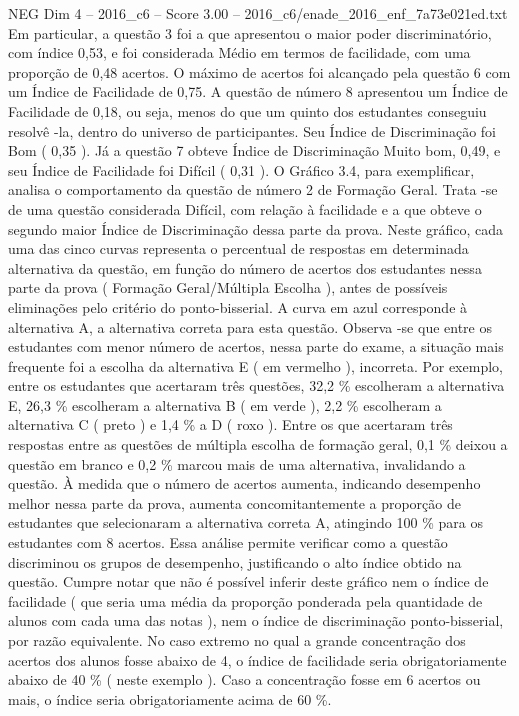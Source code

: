 \begin{textsample}{NEG Dim 4 – 2016\_c6 – Score 3.00 – 2016\_c6/enade\_2016\_enf\_7a73e021ed.txt}
Em particular, a questão 3 foi a que apresentou o maior poder discriminatório, com índice 0,53, e foi considerada Médio em termos de facilidade, com uma proporção de 0,48 acertos.
O máximo de acertos foi alcançado pela questão 6 com um Índice de Facilidade de 0,75.
A questão de número 8 apresentou um Índice de Facilidade de 0,18, ou seja, menos do que um quinto dos estudantes conseguiu resolvê -la, dentro do universo de participantes.
Seu Índice de Discriminação foi Bom ( 0,35 ).
Já a questão 7 obteve Índice de Discriminação Muito bom, 0,49, e seu Índice de Facilidade foi Difícil ( 0,31 ).
O Gráfico 3.4, para exemplificar, analisa o comportamento da questão de número 2 de Formação Geral.
Trata -se de uma questão considerada Difícil, com relação à facilidade e a que obteve o segundo maior Índice de Discriminação dessa parte da prova.
Neste gráfico, cada uma das cinco curvas representa o percentual de respostas em determinada alternativa da questão, em função do número de acertos dos estudantes nessa parte da prova ( Formação Geral/Múltipla Escolha ), antes de possíveis eliminações pelo critério do ponto-bisserial.
A curva em azul corresponde à alternativa A, a alternativa correta para esta questão.
Observa -se que entre os estudantes com menor número de acertos, nessa parte do exame, a situação mais frequente foi a escolha da alternativa E ( em vermelho ), incorreta.
Por exemplo, entre os estudantes que acertaram três questões, 32,2 \% escolheram a alternativa E, 26,3 \% escolheram a alternativa B ( em verde ), 2,2 \% escolheram a alternativa C ( preto ) e 1,4 \% a D ( roxo ).
Entre os que acertaram três respostas entre as questões de múltipla escolha de formação geral, 0,1 \% deixou a questão em branco e 0,2 \% marcou mais de uma alternativa, invalidando a questão.
À medida que o número de acertos aumenta, indicando desempenho melhor nessa parte da prova, aumenta concomitantemente a proporção de estudantes que selecionaram a alternativa correta A, atingindo 100 \% para os estudantes com 8 acertos.
Essa análise permite verificar como a questão discriminou os grupos de desempenho, justificando o alto índice obtido na questão.
Cumpre notar que não é possível inferir deste gráfico nem o índice de facilidade ( que seria uma média da proporção ponderada pela quantidade de alunos com cada uma das notas ), nem o índice de discriminação ponto-bisserial, por razão equivalente.
No caso extremo no qual a grande concentração dos acertos dos alunos fosse abaixo de 4, o índice de facilidade seria obrigatoriamente abaixo de 40 \% ( neste exemplo ).
Caso a concentração fosse em 6 acertos ou mais, o índice seria obrigatoriamente acima de 60 \%.

\end{textsample}
